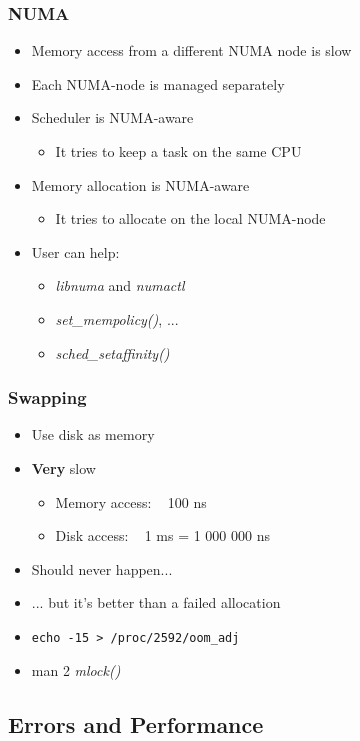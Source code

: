 \begin{frame}
  \frametitle{NUMA}

  \begin{itemize}
  \item Memory access from a different NUMA node is slow
  \item Each NUMA-node is managed separately
  \item Scheduler is NUMA-aware
    \begin{itemize}
    \item It tries to keep a task on the same CPU
    \end{itemize}
  \item Memory allocation is NUMA-aware
    \begin{itemize}
    \item It tries to allocate on the local NUMA-node
    \end{itemize}
  \item User can help:
    \begin{itemize}
    \item \emph{libnuma} and \emph{numactl}
    \item \emph{set\_mempolicy()}, ...
    \item \emph{sched\_setaffinity()}
    \end{itemize}
  \end{itemize}
\end{frame}


\begin{frame}[fragile]
  \frametitle{Swapping}

  \begin{itemize}
  \item Use disk as memory
  \item \textbf{Very} slow
    \begin{itemize}
    \item Memory access: ~ 100 ns
    \item Disk access: ~ 1 ms = 1 000 000 ns
    \end{itemize}
  \item Should never happen...
  \item ... but it's better than a failed allocation
  \item \verb+echo -15 > /proc/2592/oom_adj+
  \item man 2 \emph{mlock()}
  \end{itemize}
\end{frame}


\subsection{Errors and Performance}
\label{subsec:perf}

